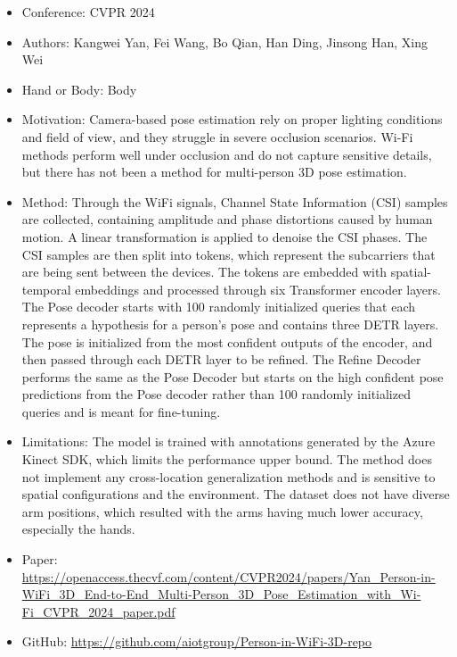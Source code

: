 \documentclass{article}
\begin{document}
\begin{itemize}
    \item Conference: CVPR 2024
    \item Authors: Kangwei Yan, Fei Wang, Bo Qian, Han Ding, Jinsong Han, Xing Wei
    \item Hand or Body: Body
    \item Motivation: Camera-based pose estimation rely on proper lighting conditions and field of view, and they struggle in severe occlusion scenarios. Wi-Fi methods perform well under occlusion and do not capture sensitive details, but there has not been a method for multi-person 3D pose estimation.
    \item Method: Through the WiFi signals, Channel State Information (CSI) samples are collected, containing amplitude and phase distortions caused by human motion. A linear transformation is applied to denoise the CSI phases. The CSI samples are then split into tokens, which represent the subcarriers that are being sent between the devices. The tokens are embedded with spatial-temporal embeddings and processed through six Transformer encoder layers. The Pose decoder starts with 100 randomly initialized queries that each represents a hypothesis for a person's pose and contains three DETR layers. The pose is initialized from the most confident outputs of the encoder, and then passed through each DETR layer to be refined. The Refine Decoder performs the same as the Pose Decoder but starts on the high confident pose predictions from the Pose decoder rather than 100 randomly initialized queries and is meant for fine-tuning.
    \item Limitations: The model is trained with annotations generated by the Azure Kinect SDK, which limits the performance upper bound. The method does not implement any cross-location generalization methods and is sensitive to spatial configurations and the environment. The dataset does not have diverse arm positions, which resulted with the arms having much lower accuracy, especially the hands.
    \item Paper: \url{https://openaccess.thecvf.com/content/CVPR2024/papers/Yan_Person-in-WiFi_3D_End-to-End_Multi-Person_3D_Pose_Estimation_with_Wi-Fi_CVPR_2024_paper.pdf}
    \item GitHub: \url{https://github.com/aiotgroup/Person-in-WiFi-3D-repo}
\end{itemize}
\end{document}
